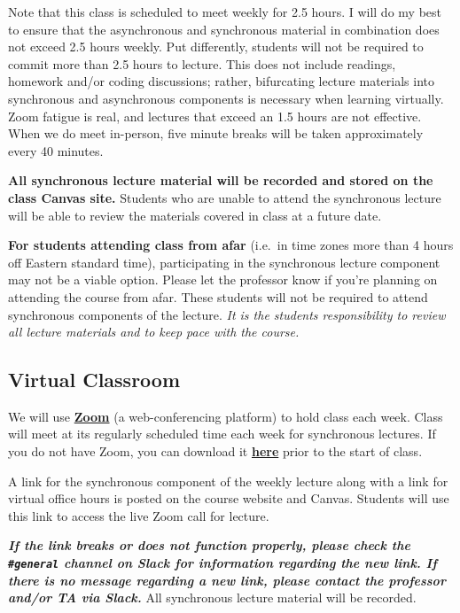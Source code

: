 \documentclass[
  12pt,
]{article}
\begin{document}
Note that this class is scheduled to meet weekly for 2.5 hours. I will
do my best to ensure that the asynchronous and synchronous material in
combination does not exceed 2.5 hours weekly. Put differently, students
will not be required to commit more than 2.5 hours to lecture. This does
not include readings, homework and/or coding discussions; rather,
bifurcating lecture materials into synchronous and asynchronous
components is necessary when learning virtually. Zoom fatigue is real,
and lectures that exceed an 1.5 hours are not effective. When we do meet
in-person, five minute breaks will be taken approximately every 40
minutes.

\textbf{All synchronous lecture material will be recorded and stored on
the class Canvas site.} Students who are unable to attend the
synchronous lecture will be able to review the materials covered in
class at a future date.

\textbf{For students attending class from afar} (i.e.~in time zones more
than 4 hours off Eastern standard time), participating in the
synchronous lecture component may not be a viable option. Please let the
professor know if you're planning on attending the course from afar.
These students will not be required to attend synchronous components of
the lecture. \emph{It is the students responsibility to review all
lecture materials and to keep pace with the course.}

\hypertarget{virtual-classroom}{%
\subsection{Virtual Classroom}\label{virtual-classroom}}

We will use \href{https://zoom.us/download}{\textbf{Zoom}} (a
web-conferencing platform) to hold class each week. Class will meet at
its regularly scheduled time each week for synchronous lectures. If you
do not have Zoom, you can download it
\href{https://zoom.us/download}{\textbf{here}} prior to the start of
class.

A link for the synchronous component of the weekly lecture along with a
link for virtual office hours is posted on the course website and
Canvas. Students will use this link to access the live Zoom call for
lecture.

\textbf{\emph{If the link breaks or does not function properly, please
check the \texttt{\#general} channel on Slack for information regarding
the new link. If there is no message regarding a new link, please
contact the professor and/or TA via Slack.}} All synchronous lecture
material will be recorded.
\end{document}
